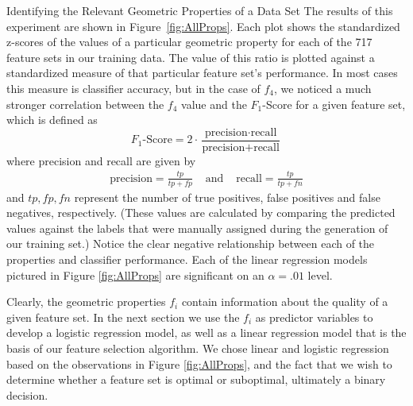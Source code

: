 \documentclass{llncs}
\begin{document}
\begin{section}{Identifying the Relevant Geometric Properties of a Data Set}
The results of this experiment are shown in Figure~\ref{fig:AllProps}. Each plot shows the standardized z-scores of the values of a particular geometric property for each of the 717 feature sets in our training data. The value of this ratio is plotted against a standardized measure of that particular feature set's performance. In most cases this measure is classifier accuracy, but in the case of $f_4$, we noticed a much stronger correlation between the $f_4$ value and the $F_1$-Score for a given feature set, which is defined as
$$\text{$F_1$-Score} = 2\cdot\frac{\text{precision}\cdot\text{recall}}{\text{precision}+\text{recall}}$$
where precision and recall are given by
\begin{eqnarray*}
\text{precision} = \frac{tp}{tp + fp} &\text{ and }&
\text{recall} = \frac{tp}{tp +fn}
\end{eqnarray*}
and $tp,fp,fn$ represent the number of true positives, false positives and false negatives, respectively. (These values are calculated by comparing the predicted values against the labels that were manually assigned during the generation of our training set.)
Notice the clear negative relationship between each of the properties and classifier performance. Each of the linear regression models pictured in Figure \ref{fig:AllProps} are significant on an $\alpha = .01$ level. 

Clearly, the geometric properties $f_i$ contain information about the quality of a given feature set. In the next section we use the $f_i$ as predictor variables to develop a logistic regression model, as well as a linear regression model that is the basis of our feature selection algorithm. We chose linear and logistic regression based on the observations in Figure \ref{fig:AllProps}, and the fact that we wish to determine whether a feature set is optimal or suboptimal, ultimately a binary decision. 
\end{section}
\end{document}

